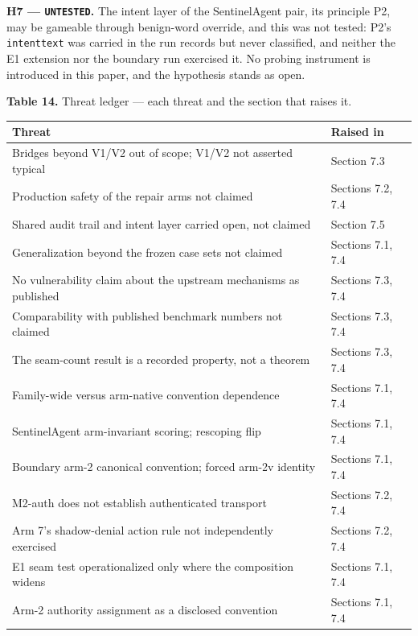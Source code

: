 \documentclass[
  10pt,
]{article}
\newcounter{none} %
\let\origtexttt\texttt
\renewcommand{\texttt}[1]{{\upshape\origtexttt{#1}}}
\renewcommand{\_}{\origunderscore\allowbreak}
\begin{document}
\textbf{H7 --- \texttt{UNTESTED}.} The intent layer of the SentinelAgent
pair, its principle P2, may be gameable through benign-word override,
and this was not tested: P2's \texttt{intent\_text} was carried in the
run records but never classified, and neither the E1 extension nor the
boundary run exercised it. No probing instrument is introduced in this
paper, and the hypothesis stands as open.

\textbf{Table 14.} Threat ledger --- each threat and the section that
raises it.

{\def\LTcaptype{none} %
\begin{longtable}[]{@{}
  >{\raggedright\arraybackslash}p{}
  >{\raggedright\arraybackslash}p{}@{}}
\toprule\noalign{}
\begin{minipage}[b]{\linewidth}\raggedright
Threat
\end{minipage} & \begin{minipage}[b]{\linewidth}\raggedright
Raised in
\end{minipage} \\
\midrule\noalign{}
\endhead
\bottomrule\noalign{}
\endlastfoot
Bridges beyond V1/V2 out of scope; V1/V2 not asserted typical & Section
7.3 \\
Production safety of the repair arms not claimed & Sections 7.2, 7.4 \\
Shared audit trail and intent layer carried open, not claimed & Section
7.5 \\
Generalization beyond the frozen case sets not claimed & Sections 7.1,
7.4 \\
No vulnerability claim about the upstream mechanisms as published &
Sections 7.3, 7.4 \\
Comparability with published benchmark numbers not claimed & Sections
7.3, 7.4 \\
The seam-count result is a recorded property, not a theorem & Sections
7.3, 7.4 \\
Family-wide versus arm-native convention dependence & Sections 7.1,
7.4 \\
SentinelAgent arm-invariant scoring; rescoping flip & Sections 7.1,
7.4 \\
Boundary arm-2 canonical convention; forced arm-2v identity & Sections
7.1, 7.4 \\
M2-auth does not establish authenticated transport & Sections 7.2,
7.4 \\
Arm 7's shadow-denial action rule not independently exercised & Sections
7.2, 7.4 \\
E1 seam test operationalized only where the composition widens &
Sections 7.1, 7.4 \\
Arm-2 authority assignment as a disclosed convention & Sections 7.1,
7.4 \\
\end{longtable}
}
\end{document}
